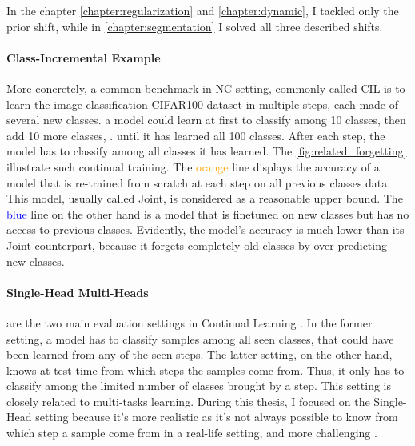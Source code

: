 In the chapter \autoref{chapter:regularization} and \autoref{chapter:dynamic}, I tackled only the
prior shift, while in \autoref{chapter:segmentation} I solved all three described shifts.


\paragraph{Class-Incremental Example} More concretely, a common benchmark in \ac{NC} setting,
commonly called \ac{CIL} is to learn the image classification CIFAR100 dataset
\citep{krizhevskycifar100} in multiple steps, each made of several new classes. \eg a model could
learn at first to classify among 10 classes, then add 10 more classes, \etc. until it has learned
all 100 classes. After each step, the model has to classify among all classes it has learned. The
\autoref{fig:related_forgetting} illustrate such continual training. The \textcolor{orange}{orange}
line displays the accuracy of a model that is re-trained from scratch at each step on all previous
classes data. This model, usually called Joint, is considered as a reasonable upper bound. The
\textcolor{blue}{blue} line on the other hand is a model that is finetuned on new classes but has no
access to previous classes. Evidently, the model's accuracy is much lower than its Joint
counterpart, because it forgets completely old classes by over-predicting new classes.

\paragraph{Single-Head \vs Multi-Heads} are the two main evaluation settings in Continual Learning
\citep{chaudhry2018riemannien_walk}. In the former setting, a model has to classify samples among
all seen classes, that could have been learned from any of the seen steps. The latter setting, on
the other hand, knows at test-time from which steps the samples come from. Thus, it only has to
classify among the limited number of classes brought by a step. This setting is closely related to
multi-tasks learning. During this thesis, I focused on the Single-Head setting because it's more
realistic as it's not always possible to know from which step a sample come from in a real-life
setting, and more challenging \citep{lesort2019regulshortcomings}.

